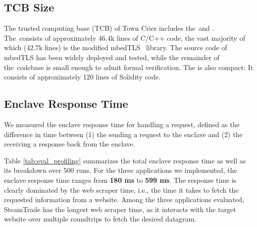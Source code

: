 \subsection{TCB Size}
The trusted computing base (TCB) of Town Crier includes the~\encname and \tcontract. The~\encname consists of approximately 46.4k
lines of C/C++ code, the vast majority of which (42.7k lines) is the modified mbedTLS~\cite{mbedtls}
library. The source code of mbedTLS has been widely deployed and tested, while the
remainder of the~\encname codebase is small enough to admit formal verification.
The \tcontract is also compact: It consists of approximately 120 lines of Solidity code.

\subsection{Enclave Response Time}
\label{subsec:response time}
We measured the enclave response time for handling a \tc request, defined as the
difference in time between (1)  
the \medname sending a request to the enclave 
and (2) the \medname receiving a response back from the enclave. 

Table \ref{tab:eval_profiling} summarizes the total enclave response time as
well as its breakdown over 500 runs.  For the three applications we
implemented, the enclave response time ranges from {\bf 180 ms} to {\bf 599 ms}.
The response time is clearly dominated by the web scraper time, i.e., the time
it takes to fetch the requested information from a website.  Among the three
applications evaluated, {\sf SteamTrade} has the longest web scraper time, as it interacts with the target website
over multiple roundtrips to fetch the desired datagram.



